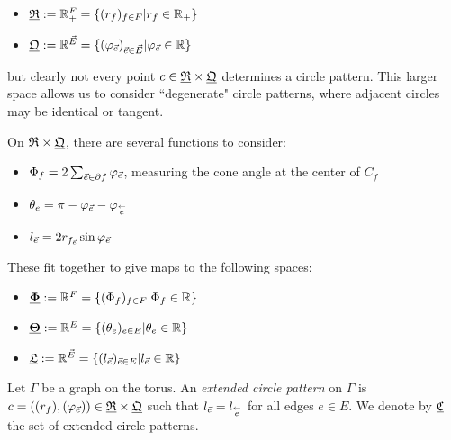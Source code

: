 \begin{itemize}
	\item ${\underline{\mathfrak{R}}} := \mathbb{R}_+^F = \{(r_f)_{f\in F} | r_f \in \mathbb{R}_+\}$
	\item ${\underline{\mathfrak{Q}}} := \mathbb{R}^{\vec{E}} =
		\{(\varphi_{\vec{e}})_{\vec{e} \in \vec{E}} | \varphi_{\vec{e}} \in \mathbb{R}\}$
\end{itemize}
but clearly not every point $c\in {\underline{\mathfrak{R}}} \times {\underline{\mathfrak{Q}}}$ determines a circle pattern.
This larger space allows us to consider
``degenerate" circle patterns, where adjacent circles may
be identical or tangent.


On ${\underline{\mathfrak{R}}} \times {\underline{\mathfrak{Q}}}$, there are several functions to consider:
\begin{itemize}
	\item $\Phi_f = 2 \sum_{\vec{e} \in \partial f} \varphi_{\vec{e}}$, measuring the cone angle
		at the center of $C_f$
	\item $\theta_e = \pi - \varphi_{\vec{e}} - \varphi_{\overset{\leftarrow}{e}}$
	\item $l_{\vec{e}} = 2 r_{f_{\vec{e}}} \sin \varphi_{\vec{e}}$
\end{itemize}

These fit together to give maps to the following spaces:

\begin{itemize}
	\item ${\underline{\mathbf{\Phi}}} := \mathbb{R}^F = \{(\Phi_f)_{f\in F} | \Phi_f \in \mathbb{R}\}$
	\item ${\underline{\mathbf{\Theta}}} := \mathbb{R}^E = \{(\theta_e)_{e \in E} | \theta_e \in \mathbb{R}\}$
	\item ${\underline{\mathfrak{L}}} := \mathbb{R}^{\vec{E}} = \{(l_{\vec{e}})_{\vec{e} \in E} | l_{\vec{e}} \in \mathbb{R}\}$
\end{itemize}



\begin{define}
Let $\Gamma$ be a graph on the torus.
An \emph{extended circle pattern} on $\Gamma$ is
$c = ((r_f), (\varphi_{\vec{e}})) \in {\underline{\mathfrak{R}}} \times {\underline{\mathfrak{Q}}}$
such that $l_{\vec{e}} = l_{\overset{\leftarrow}{e}}$ for all edges $e\in E$. We denote by
${\underline{\mathfrak{C}}}$ the set of extended circle patterns.
\end{define}





